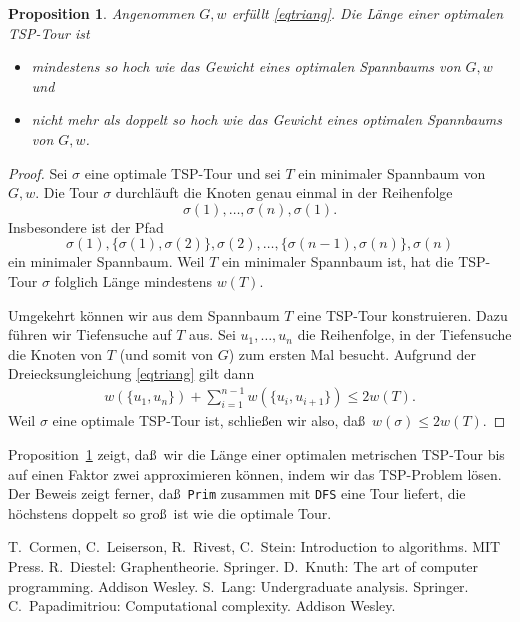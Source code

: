 \documentclass[10pt,reqno]{amsart}
\numberwithin{equation}{section}
\newtheorem{proposition}[definition]{Proposition}
\newcommand\Prop{Proposition}
\begin{document}
\begin{proposition}\label{prop_metric_tsp}
	Angenommen $G,w$ erf\"ullt \eqref{eqtriang}.
	Die L\"ange einer optimalen TSP-Tour ist
	\begin{itemize}
		\item mindestens so hoch wie das Gewicht eines optimalen Spannbaums von $G,w$ und
		\item nicht mehr als doppelt so hoch wie das Gewicht eines optimalen Spannbaums von $G,w$.
	\end{itemize}
\end{proposition}
\begin{proof}
	Sei $\sigma$ eine optimale TSP-Tour und sei $T$ ein minimaler Spannbaum von $G,w$.
	Die Tour $\sigma$ durchl\"auft die Knoten genau einmal in der Reihenfolge
		$$\sigma(1),\ldots,\sigma(n),\sigma(1).$$
	Insbesondere ist der Pfad
		$$\sigma(1),\{\sigma(1),\sigma(2)\},\sigma(2),\ldots,\{\sigma(n-1),\sigma(n)\},\sigma(n)$$
	ein minimaler Spannbaum.
	Weil $T$ ein minimaler Spannbaum ist, hat die TSP-Tour $\sigma$ folglich L\"ange mindestens $w(T)$.

	Umgekehrt k\"onnen wir aus dem Spannbaum $T$ eine TSP-Tour konstruieren.
	Dazu f\"uhren wir Tiefensuche auf $T$ aus.
	Sei $u_1,\ldots,u_n$ die Reihenfolge, in der Tiefensuche die Knoten von $T$ (und somit von $G$) zum ersten Mal besucht.
	Aufgrund der Dreiecksungleichung \eqref{eqtriang} gilt dann
	\begin{align*}
		w(\{u_1,u_n\})+\sum_{i=1}^{n-1}w(\{u_i,u_{i+1}\})\leq 2w(T).
	\end{align*}
	Weil $\sigma$ eine optimale TSP-Tour ist, schlie\ss en wir also, da\ss\ $w(\sigma)\leq2 w(T)$.
\end{proof}

\Prop~\ref{prop_metric_tsp} zeigt, da\ss\ wir die L\"ange einer optimalen metrischen TSP-Tour bis auf einen Faktor zwei approximieren k\"onnen, indem wir das TSP-Problem l\"osen.
Der Beweis zeigt ferner, da\ss\ {\tt Prim} zusammen mit {\tt DFS} eine Tour liefert, die h\"ochstens doppelt so gro\ss\ ist wie die optimale Tour.


\begin{thebibliography}{99}
	T.~Cormen, C.~Leiserson, R.~Rivest, C.~Stein: Introduction to algorithms. MIT Press.
	R.~Diestel: Graphentheorie. Springer.
	D.~Knuth: The art of computer programming. Addison Wesley.
	S.~Lang: Undergraduate analysis. Springer.
	C.~Papadimitriou: Computational complexity. Addison Wesley.
\end{thebibliography}
\end{document}
